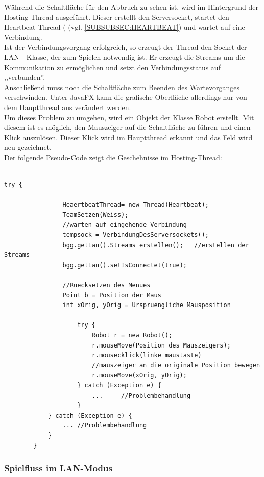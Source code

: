 \documentclass[12pt,a4paper]{article}
\begin{document}
Während die Schaltfläche für den Abbruch zu sehen ist, wird im Hintergrund der Hosting-Thread ausgeführt. Dieser erstellt den Serversocket, startet den Heartbeat-Thread (  (vgl. \ref{SUBSUBSEC:HEARTBEAT}) und wartet auf eine Verbindung. \\[2ex]
Ist der Verbindungsvorgang erfolgreich, so erzeugt der Thread den Socket der LAN - Klasse, der zum Spielen notwendig ist. Er erzeugt die Streams um die Kommunikation zu ermöglichen und setzt den Verbindungsstatus auf ,,verbunden''. \\
Anschließend muss noch die Schaltfläche zum Beenden des Wartevorganges verschwinden. Unter JavaFX kann die grafische Oberfläche allerdings nur von dem Hauptthread aus verändert werden.\\ 
Um dieses Problem zu umgehen, wird ein Objekt der Klasse Robot erstellt. Mit diesem ist es möglich, den Mauszeiger auf die Schaltfläche zu führen und einen Klick auszulösen. 
Dieser Klick wird im Hauptthread erkannt und das Feld wird neu gezeichnet. \\
Der folgende Pseudo-Code zeigt die Geschehnisse im Hosting-Thread:\\
\lstset{language=java}
\begin{lstlisting}

try {
				
				HeaertbeatThread= new Thread(Heartbeat);
				TeamSetzen(Weiss);
				//warten auf eingehende Verbindung
				tempsock = VerbindungDesServersockets();
				bgg.getLan().Streams erstellen();	//erstellen der Streams
				bgg.getLan().setIsConnectet(true);
				
				//Ruecksetzen des Menues
				Point b = Position der Maus
				int xOrig, yOrig = Urspruengliche Mausposition
		      
		            try {
		                Robot r = new Robot();
		                r.mouseMove(Position des Mauszeigers);
		                r.mousecklick(linke maustaste)
		                //mauszeiger an die originale Position bewegen
		                r.mouseMove(xOrig, yOrig);
		            } catch (Exception e) {
		                ...  	//Problembehandlung
		            }
			} catch (Exception e) {
				...	//Problembehandlung
			}		
		}

\end{lstlisting}

\subsubsection{Spielfluss im LAN-Modus}
\end{document}
